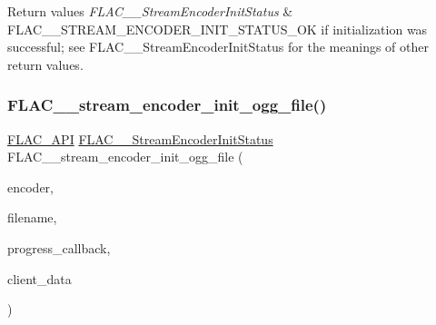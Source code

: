 \begin{DoxyRetVals}{Return values}
{\em F\+L\+A\+C\+\_\+\+\_\+\+Stream\+Encoder\+Init\+Status} & {\ttfamily F\+L\+A\+C\+\_\+\+\_\+\+S\+T\+R\+E\+A\+M\+\_\+\+E\+N\+C\+O\+D\+E\+R\+\_\+\+I\+N\+I\+T\+\_\+\+S\+T\+A\+T\+U\+S\+\_\+\+OK} if initialization was successful; see F\+L\+A\+C\+\_\+\+\_\+\+Stream\+Encoder\+Init\+Status for the meanings of other return values. \\
\hline
\end{DoxyRetVals}
\mbox{\label{group__flac__stream__encoder_ga51eb79f04e9a676cd1ce0c94729252e4}} 
\subsubsection{\texorpdfstring{F\+L\+A\+C\+\_\+\+\_\+stream\+\_\+encoder\+\_\+init\+\_\+ogg\+\_\+file()}{FLAC\_\_stream\_encoder\_init\_ogg\_file()}}
{\footnotesize\ttfamily \hyperlink{group__flac__export_ga56ca07df8a23310707732b1c0007d6f5}{F\+L\+A\+C\+\_\+\+A\+PI} \hyperlink{group__flac__stream__encoder_ga3bb869620af2b188d77982a5c30b047d}{F\+L\+A\+C\+\_\+\+\_\+\+Stream\+Encoder\+Init\+Status} F\+L\+A\+C\+\_\+\+\_\+stream\+\_\+encoder\+\_\+init\+\_\+ogg\+\_\+file (\begin{DoxyParamCaption}\item[{\hyperlink{struct_f_l_a_c_____stream_encoder}{F\+L\+A\+C\+\_\+\+\_\+\+Stream\+Encoder} $\ast$}]{encoder,  }\item[{\hyperlink{zconf_8h_a2c212835823e3c54a8ab6d95c652660e}{const} char $\ast$}]{filename,  }\item[{\hyperlink{group__flac__stream__encoder_ga6e051c0e5837433f9e7cd56cd42ca6ba}{F\+L\+A\+C\+\_\+\+\_\+\+Stream\+Encoder\+Progress\+Callback}}]{progress\+\_\+callback,  }\item[{\hyperlink{png_8h_ac9c84fa68bbad002983e35ce3663c686}{void} $\ast$}]{client\+\_\+data }\end{DoxyParamCaption})}

